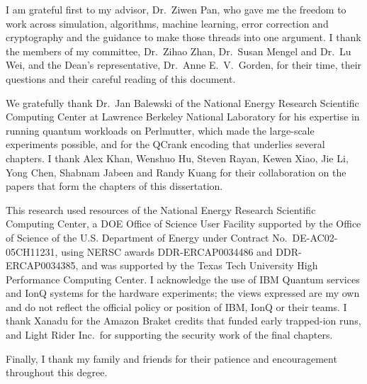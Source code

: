 \begin{acknowledgments}
I am grateful first to my advisor, Dr.~Ziwen Pan, who gave me the freedom to work across simulation, algorithms, machine learning, error correction and cryptography and the guidance to make those threads into one argument. I thank the members of my committee, Dr.~Zihao Zhan, Dr.~Susan Mengel and Dr.~Lu Wei, and the Dean's representative, Dr.~Anne E.~V.~Gorden, for their time, their questions and their careful reading of this document.

We gratefully thank Dr.~Jan Balewski of the National Energy Research Scientific Computing Center at Lawrence Berkeley National Laboratory for his expertise in running quantum workloads on Perlmutter, which made the large-scale experiments possible, and for the QCrank encoding that underlies several chapters. I thank Alex Khan, Wenshuo Hu, Steven Rayan, Kewen Xiao, Jie Li, Yong Chen, Shabnam Jabeen and Randy Kuang for their collaboration on the papers that form the chapters of this dissertation.

This research used resources of the National Energy Research Scientific Computing Center, a DOE Office of Science User Facility supported by the Office of Science of the U.S. Department of Energy under Contract No.~DE-AC02-05CH11231, using NERSC awards DDR-ERCAP0034486 and DDR-ERCAP0034385, and was supported by the Texas Tech University High Performance Computing Center. I acknowledge the use of IBM Quantum services and IonQ systems for the hardware experiments; the views expressed are my own and do not reflect the official policy or position of IBM, IonQ or their teams. I thank Xanadu for the Amazon Braket credits that funded early trapped-ion runs, and Light Rider Inc.\ for supporting the security work of the final chapters.

Finally, I thank my family and friends for their patience and encouragement throughout this degree.
\end{acknowledgments}

